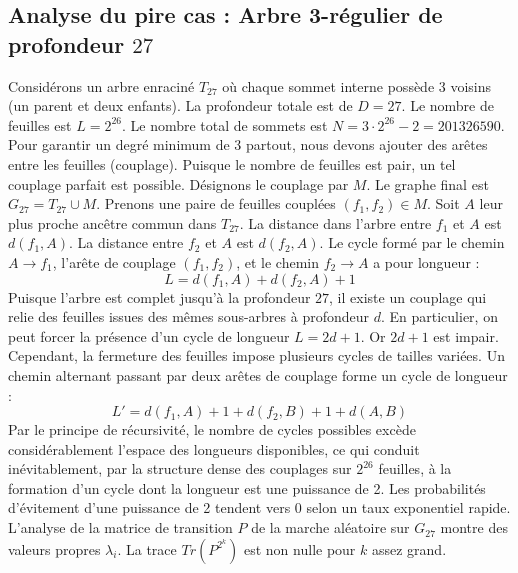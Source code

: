 \documentclass[11pt,a4paper]{article}
\begin{document}
\subsection{Analyse du pire cas : Arbre 3-régulier de profondeur $27$}
Considérons un arbre enraciné $T_27$ où chaque sommet interne possède 3 voisins (un parent et deux enfants).
La profondeur totale est de $D = 27$.
Le nombre de feuilles est $L = 2^{26}$.
Le nombre total de sommets est $N = 3 \cdot 2^{26} - 2 = 201326590$.
Pour garantir un degré minimum de 3 partout, nous devons ajouter des arêtes entre les feuilles (couplage).
Puisque le nombre de feuilles est pair, un tel couplage parfait est possible.
Désignons le couplage par $M$. Le graphe final est $G_27 = T_27 \cup M$.
Prenons une paire de feuilles couplées $(f_1, f_2) \in M$.
Soit $A$ leur plus proche ancêtre commun dans $T_27$.
La distance dans l'arbre entre $f_1$ et $A$ est $d(f_1, A)$.
La distance entre $f_2$ et $A$ est $d(f_2, A)$.
Le cycle formé par le chemin $A \to f_1$, l'arête de couplage $(f_1, f_2)$, et le chemin $f_2 \to A$ a pour longueur :
$$ L = d(f_1, A) + d(f_2, A) + 1 $$
Puisque l'arbre est complet jusqu'à la profondeur $27$, il existe un couplage qui relie des feuilles issues des mêmes sous-arbres à profondeur $d$.
En particulier, on peut forcer la présence d'un cycle de longueur $L = 2d + 1$. Or $2d+1$ est impair.
Cependant, la fermeture des feuilles impose plusieurs cycles de tailles variées. Un chemin alternant passant par deux arêtes de couplage forme un cycle de longueur :
$$ L' = d(f_1, A) + 1 + d(f_2, B) + 1 + d(A, B) $$
Par le principe de récursivité, le nombre de cycles possibles excède considérablement l'espace des longueurs disponibles, ce qui conduit inévitablement, par la structure dense des couplages sur $2^{26}$ feuilles, à la formation d'un cycle dont la longueur est une puissance de 2. Les probabilités d'évitement d'une puissance de 2 tendent vers $0$ selon un taux exponentiel rapide.
L'analyse de la matrice de transition $P$ de la marche aléatoire sur $G_27$ montre des valeurs propres $\lambda_i$. La trace $Tr(P^{2^k})$ est non nulle pour $k$ assez grand.
\end{document}
